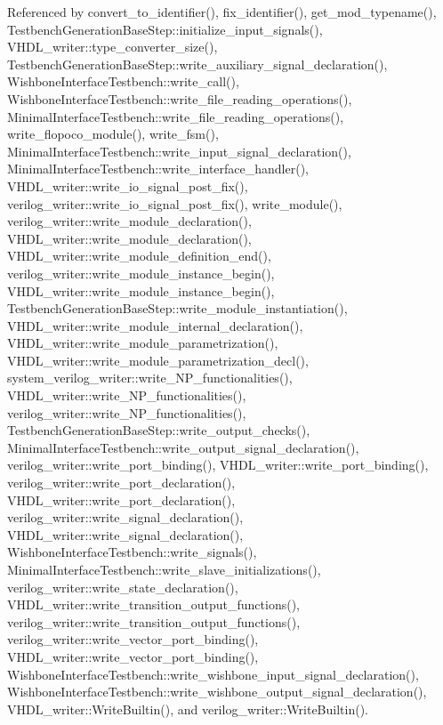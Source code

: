 Referenced by convert\+\_\+to\+\_\+identifier(), fix\+\_\+identifier(), get\+\_\+mod\+\_\+typename(), Testbench\+Generation\+Base\+Step\+::initialize\+\_\+input\+\_\+signals(), V\+H\+D\+L\+\_\+writer\+::type\+\_\+converter\+\_\+size(), Testbench\+Generation\+Base\+Step\+::write\+\_\+auxiliary\+\_\+signal\+\_\+declaration(), Wishbone\+Interface\+Testbench\+::write\+\_\+call(), Wishbone\+Interface\+Testbench\+::write\+\_\+file\+\_\+reading\+\_\+operations(), Minimal\+Interface\+Testbench\+::write\+\_\+file\+\_\+reading\+\_\+operations(), write\+\_\+flopoco\+\_\+module(), write\+\_\+fsm(), Minimal\+Interface\+Testbench\+::write\+\_\+input\+\_\+signal\+\_\+declaration(), Minimal\+Interface\+Testbench\+::write\+\_\+interface\+\_\+handler(), V\+H\+D\+L\+\_\+writer\+::write\+\_\+io\+\_\+signal\+\_\+post\+\_\+fix(), verilog\+\_\+writer\+::write\+\_\+io\+\_\+signal\+\_\+post\+\_\+fix(), write\+\_\+module(), verilog\+\_\+writer\+::write\+\_\+module\+\_\+declaration(), V\+H\+D\+L\+\_\+writer\+::write\+\_\+module\+\_\+declaration(), V\+H\+D\+L\+\_\+writer\+::write\+\_\+module\+\_\+definition\+\_\+end(), verilog\+\_\+writer\+::write\+\_\+module\+\_\+instance\+\_\+begin(), V\+H\+D\+L\+\_\+writer\+::write\+\_\+module\+\_\+instance\+\_\+begin(), Testbench\+Generation\+Base\+Step\+::write\+\_\+module\+\_\+instantiation(), V\+H\+D\+L\+\_\+writer\+::write\+\_\+module\+\_\+internal\+\_\+declaration(), V\+H\+D\+L\+\_\+writer\+::write\+\_\+module\+\_\+parametrization(), V\+H\+D\+L\+\_\+writer\+::write\+\_\+module\+\_\+parametrization\+\_\+decl(), system\+\_\+verilog\+\_\+writer\+::write\+\_\+\+N\+P\+\_\+functionalities(), V\+H\+D\+L\+\_\+writer\+::write\+\_\+\+N\+P\+\_\+functionalities(), verilog\+\_\+writer\+::write\+\_\+\+N\+P\+\_\+functionalities(), Testbench\+Generation\+Base\+Step\+::write\+\_\+output\+\_\+checks(), Minimal\+Interface\+Testbench\+::write\+\_\+output\+\_\+signal\+\_\+declaration(), verilog\+\_\+writer\+::write\+\_\+port\+\_\+binding(), V\+H\+D\+L\+\_\+writer\+::write\+\_\+port\+\_\+binding(), verilog\+\_\+writer\+::write\+\_\+port\+\_\+declaration(), V\+H\+D\+L\+\_\+writer\+::write\+\_\+port\+\_\+declaration(), verilog\+\_\+writer\+::write\+\_\+signal\+\_\+declaration(), V\+H\+D\+L\+\_\+writer\+::write\+\_\+signal\+\_\+declaration(), Wishbone\+Interface\+Testbench\+::write\+\_\+signals(), Minimal\+Interface\+Testbench\+::write\+\_\+slave\+\_\+initializations(), verilog\+\_\+writer\+::write\+\_\+state\+\_\+declaration(), V\+H\+D\+L\+\_\+writer\+::write\+\_\+transition\+\_\+output\+\_\+functions(), verilog\+\_\+writer\+::write\+\_\+transition\+\_\+output\+\_\+functions(), verilog\+\_\+writer\+::write\+\_\+vector\+\_\+port\+\_\+binding(), V\+H\+D\+L\+\_\+writer\+::write\+\_\+vector\+\_\+port\+\_\+binding(), Wishbone\+Interface\+Testbench\+::write\+\_\+wishbone\+\_\+input\+\_\+signal\+\_\+declaration(), Wishbone\+Interface\+Testbench\+::write\+\_\+wishbone\+\_\+output\+\_\+signal\+\_\+declaration(), V\+H\+D\+L\+\_\+writer\+::\+Write\+Builtin(), and verilog\+\_\+writer\+::\+Write\+Builtin().

